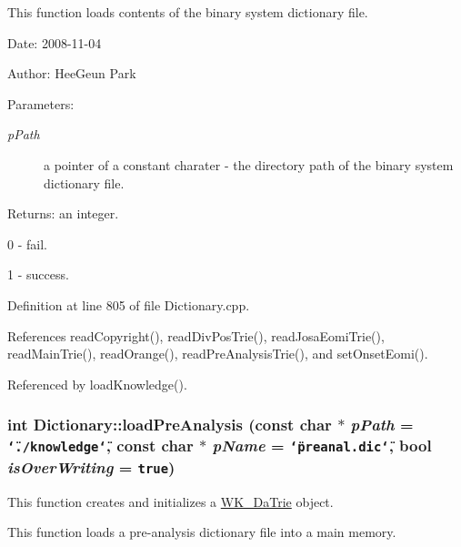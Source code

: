 This function loads contents of the binary system dictionary file. 

\begin{Desc}
\item[Date:]2008-11-04 \end{Desc}
\begin{Desc}
\item[Author:]HeeGeun Park \end{Desc}
\begin{Desc}
\item[Parameters:]
\begin{description}
\item[{\em pPath}]a pointer of a constant charater - the directory path of the binary system dictionary file. \end{description}
\end{Desc}
\begin{Desc}
\item[Returns:]an integer.\par
 0 - fail.\par
 1 - success. \end{Desc}


Definition at line 805 of file Dictionary.cpp.

References readCopyright(), readDivPosTrie(), readJosaEomiTrie(), readMainTrie(), readOrange(), readPreAnalysisTrie(), and setOnsetEomi().

Referenced by loadKnowledge().\hypertarget{classkmaOrange_1_1Dictionary_8a78b756e3a98be8ded1f5a38b5bd4ae}{
\subsubsection[{loadPreAnalysis}]{\setlength{\rightskip}{0pt plus 5cm}int Dictionary::loadPreAnalysis (const char $\ast$ {\em pPath} = {\tt \char`\"{}./knowledge\char`\"{}}, \/  const char $\ast$ {\em pName} = {\tt \char`\"{}preanal.dic\char`\"{}}, \/  bool {\em isOverWriting} = {\tt true})}}
\label{classkmaOrange_1_1Dictionary_8a78b756e3a98be8ded1f5a38b5bd4ae}


This function creates and initializes a \hyperlink{classkmaOrange_1_1WK__DaTrie}{WK\_\-DaTrie} object.\par
 This function loads a pre-analysis dictionary file into a main memory. 

